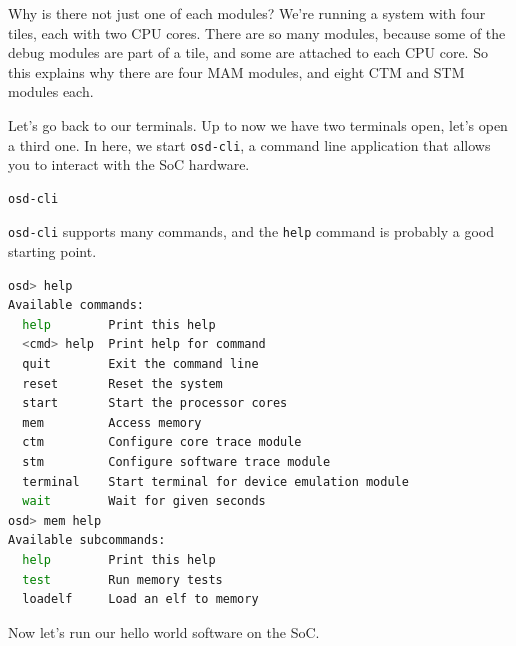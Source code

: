 Why is there not just one of each modules?
We're running a system with four tiles, each with two CPU cores.
There are so many modules, because some of the debug modules are part of a tile, and some are attached to each CPU core.
So this explains why there are four MAM modules, and eight CTM and STM modules each.

Let's go back to our terminals.
Up to now we have two terminals open, let's open a third one.
In here, we start \verb|osd-cli|, a command line application that allows you to interact with the SoC hardware.
\begin{lstlisting}[language=sh]
osd-cli
\end{lstlisting}

\verb|osd-cli| supports many commands, and the \verb|help| command is probably a good starting point.

\begin{lstlisting}[language=sh]
osd> help
Available commands:
  help        Print this help
  <cmd> help  Print help for command
  quit        Exit the command line
  reset       Reset the system
  start       Start the processor cores
  mem         Access memory
  ctm         Configure core trace module
  stm         Configure software trace module
  terminal    Start terminal for device emulation module
  wait        Wait for given seconds
osd> mem help
Available subcommands:
  help        Print this help
  test        Run memory tests
  loadelf     Load an elf to memory
\end{lstlisting}

Now let's run our hello world software on the SoC.

